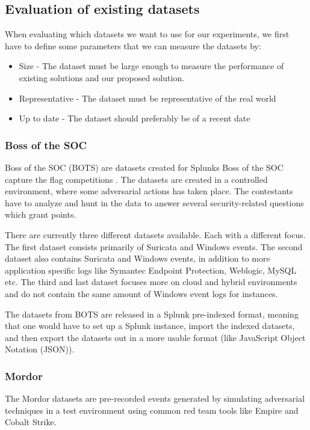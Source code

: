 \subsection{Evaluation of existing datasets}
\label{sub:evaluation-of-existing-datasets}
When evaluating which datasets we want to use for our experiments, we first have to define some parameters that we can measure the datasets by:
\begin{itemize}
    \item Size - The dataset must be large enough to measure the performance of existing solutions and our proposed solution.
    \item Representative - The dataset must be representative of the real world
    \item Up to date - The dataset should preferably be of a recent date
\end{itemize}

\subsubsection{Boss of the SOC}
Boss of the SOC (BOTS) are datasets created for Splunks Boss of the SOC capture the flag competitions \cite{bossofthesocdatasets}. The datasets are created in a controlled environment, where some adversarial actions has taken place. The contestants have to analyze and hunt in the data to answer several security-related questions which grant points.

There are currently three different datasets available. Each with a different focus. The first dataset consists primarily of Suricata \cite{Suricata49:online} and Windows events. The second dataset also contains Suricata and Windows events, in addition to more application specific logs like Symantec Endpoint Protection, Weblogic, MySQL etc. The third and last dataset focuses more on cloud and hybrid environments and do not contain the same amount of Windows event logs for instances.

The datasets from BOTS are released in a Splunk pre-indexed format, meaning that one would have to set up a Splunk instance, import the indexed datasets, and then export the datasets out in a more usable format (like JavaScript Object Notation (JSON)). 

\subsubsection{Mordor}
The Mordor datasets \cite{mordor_datasets} are pre-recorded events generated by simulating adversarial techniques in a test environment using common red team tools like Empire and Cobalt Strike.


